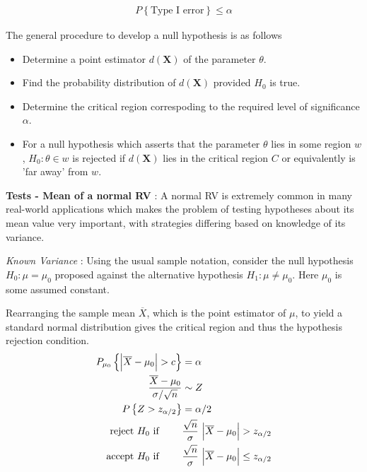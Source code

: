 \begin{align}
	P  \left\{\text{Type I error}\right\} \leq \alpha 
\end{align}

The general procedure to develop a null hypothesis is as follows

\begin{itemize}
	\item Determine a point estimator $ d(\textbf{X}) $ of the parameter $ \theta $.
	\item Find the probability distribution of $ d(\textbf{X}) $ provided $ H_0 $ is true.
	\item Determine the critical region correspoding to the required level of significance $ \alpha $.
	\item For a null hypothesis which asserts that the parameter $ \theta $ lies in some region $ w $,
	 $ H_0 : \theta \in w $ is rejected if $ d(\textbf{X}) $ lies in the critical region $ C $ or equivalently is 'far away' from $ w $.
\end{itemize}


\textbf{Tests - Mean of a normal RV} : A normal RV is extremely common in many real-world applications which makes the problem of testing hypotheses about its mean value very important, with strategies differing based on knowledge of its variance.

\textit{Known Variance} : Using the usual sample notation, consider the null hypothesis $ H_0 : \mu = \mu_0 $ proposed against the alternative hypothesis $ H_1 : \mu \neq \mu_0 $. Here $ \mu_0 $ is some assumed constant.

Rearranging the sample mean $ \overline{X} $, which is the point estimator of $ \mu $, to yield a standard normal distribution gives the critical region and thus the hypothesis rejection condition.
\begin{align}
	P_{\mu_0} \left\{ \Big|\overline{X} - \mu_0\Big|  > c\right\} &= \alpha \\
	\frac{\overline{X} - \mu_0}{\sigma / \sqrt{n}} &\sim Z \nonumber \\
	P \left\{Z > z_{\alpha/2}\right\} &= \alpha/2 \nonumber \\
	\text{reject $ H_0 $ if } \qquad & \frac{\sqrt{n}}{\sigma}\ \Big| \overline{X} - \mu_0 \Big| > z_{\alpha/2} \nonumber \\
	\text{accept $ H_0 $ if } \qquad & \frac{\sqrt{n}}{\sigma}\ \Big| \overline{X} - \mu_0 \Big| \leq z_{\alpha/2}
\end{align}


